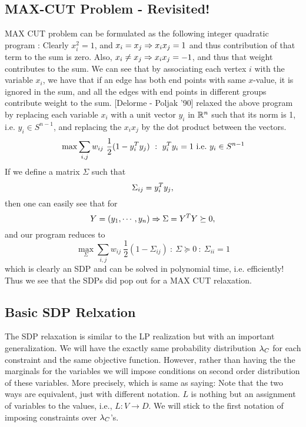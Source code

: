 \subsection{MAX-CUT Problem - Revisited!}

MAX CUT problem can be formulated as the following integer quadratic program : 
Clearly $x_i^2=1$, and $x_i=x_j\Rightarrow x_ix_j=1$ and thus contribution of that term to the sum is zero. 
Also, $x_i \neq x_j \Rightarrow x_ix_j=-1$, and thus that weight contributes to the sum. 
We can see that by associating each vertex $i$ with the variable $x_i$, we have that if an edge has both end points with same $x$-value, it is ignored in the sum, and all the edges with end points in different groups contribute weight to the sum. 
[Delorme - Poljak '90] relaxed the above program by replacing each variable $x_i$ with a unit vector $y_i$ in $\mathbb{R}^n$ such that its norm is 1, i.e. $y_i \in S^{n-1}$, and replacing the $x_ix_j$ by the dot product between the vectors. 
\[ \max \sum_{i,j} w_{ij} \ \frac{1}{2}(1-y_i^T y_j) ~:~ y_i^T y_i = 1 {\mbox {\ i.e.\ }} y_i \in S^{n-1} \]
If we define a matrix $\Sigma$ such that $$\Sigma_{ij} = y_i^T y_j,$$ then one can easily see that for $$Y = (y_1, \cdots, y_n) \Rightarrow \Sigma = Y^T Y \succeq 0,$$ and our program reduces to 
\[ \max_\Sigma \sum_{i,j} w_{ij} \ \frac{1}{2}(1-\Sigma_{ij}) ~:~ \Sigma \succeq 0 ~:~ \Sigma_{ii} = 1  \]
which is clearly an SDP and can be solved in polynomial time, i.e. efficiently! 
Thus we see that the SDPs did pop out for a MAX CUT relaxation.

\subsection{Basic SDP Relxation}

The SDP relaxation is similar to the LP realization but with an important generalization. 
We will have the exactly same probability distribution $\lambda_C$ for each constraint and the same objective function. 
However, rather than having the the marginals for the variables we will impose conditions on second order distribution of these variables. 
More precisely,
which is same as saying: 
Note that the two ways are equivalent, just with different notation. 
$L$ is nothing but an assignment of variables to the values, i.e., $L : V \rightarrow D$. 
We will stick to the first notation of imposing constraints over $\lambda_C$'s. 

